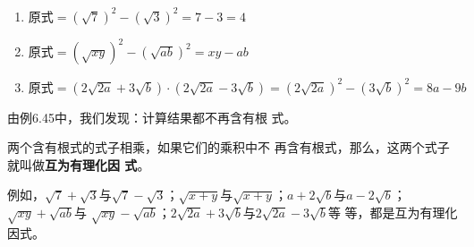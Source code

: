 \begin{solution}
    \begin{enumerate}
        \item $\text{原式}=\left(\sqrt{7}\right)^2-\left(\sqrt{3}\right)^2=7-3=4$
        \item $\text{原式}=\left(\sqrt{xy}\right)^2-\left(\sqrt{ab}\right)^2=xy-ab$
        \item $\text{原式}=\left(2\sqrt{2a}+3\sqrt{b}\right)\cdot\left(2\sqrt{2a}-3\sqrt{b}\right)=\left(2\sqrt{2a}\right)^2-\left(3\sqrt{b}\right)^2=8a-9b$
    \end{enumerate}    
\end{solution}

由例6.45中，我们发现：计算结果都不再含有根
式。

两个含有根式的式子相乘，如果它们的乘积中不
再含有根式，那么，这两个式子就叫做\textbf{互为有理化因
式}。

例如，$\sqrt{7}+\sqrt{3}$与$\sqrt{7}-\sqrt{3}$；$\sqrt{x+y}$与$\sqrt{x+y}$；$a+2\sqrt{b}$与$a-2\sqrt{b}$；$\sqrt{xy}+\sqrt{ab}$与
$\sqrt{xy}-\sqrt{ab}$；$2\sqrt{2a}+3\sqrt{b}$与$2\sqrt{2a}-3\sqrt{b}$等
等，都是互为有理化因式。

